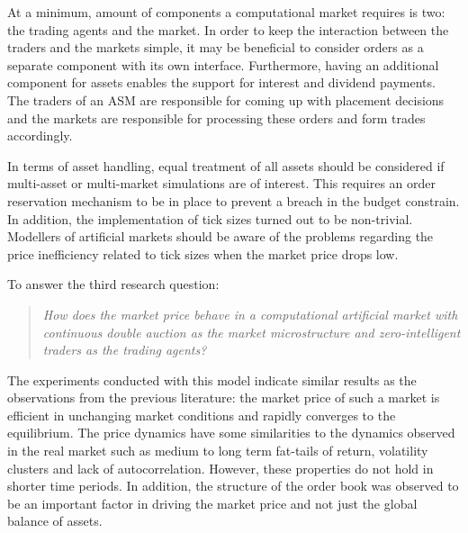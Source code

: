 At a minimum, amount of components a computational market requires is two: the trading agents and the 
market. In order to keep the interaction between the traders and the markets simple, it may be beneficial to 
consider orders as a separate component with its own interface. Furthermore, having an additional component for 
assets enables the support for interest and dividend payments. The traders of an ASM are responsible for coming up with 
placement decisions and the markets are responsible for processing these orders and form trades accordingly. 

In terms of asset handling, equal treatment of 
all assets should be considered if multi-asset or multi-market simulations are of interest. 
This requires an order reservation mechanism to be in place to prevent a breach in the 
budget constrain. In addition, the implementation of tick sizes turned out to be non-trivial. 
Modellers of artificial markets should be aware of the problems regarding the price inefficiency 
related to tick sizes when the market price drops low. 


To answer the third research question:
\begin{quote}
    \textit{How does the market price behave in a computational artificial market with continuous
    double auction as the market microstructure and zero-intelligent traders as the 
    trading agents?} 
\end{quote}
The experiments conducted with this model indicate similar results as the observations from 
the previous literature: the market price of such a market is efficient in unchanging market conditions
and rapidly converges to the equilibrium. The price dynamics have some similarities to the dynamics 
observed in the real market such as medium to long term fat-tails of return, volatility clusters and 
lack of autocorrelation. However, these properties do not hold in shorter time periods. In addition, 
the structure of the order book was observed to be an important factor in driving the market price and 
not just the global balance of assets. 


